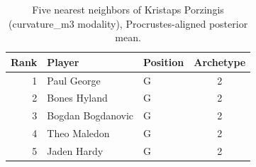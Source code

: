 \begin{table}[htbp]
  \centering\small
  \begin{tabular}{rllc}
    \toprule
    Rank & Player & Position & Archetype \\
    \midrule
    1 & Paul George & G & 2 \\
    2 & Bones Hyland & G & 2 \\
    3 & Bogdan Bogdanovic & G & 2 \\
    4 & Theo Maledon & G & 2 \\
    5 & Jaden Hardy & G & 2 \\
    \bottomrule
  \end{tabular}
  \caption{Five nearest neighbors of Kristaps Porzingis (curvature_m3 modality), Procrustes-aligned posterior mean.}
  \label{tab:Kristaps_Porzingis_neighbors_curvature_m3}
\end{table}

